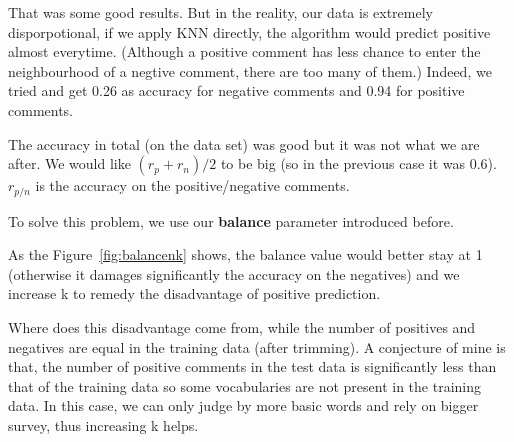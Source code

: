 \documentclass{article}
\begin{document}
That was some good results. But in the reality, our data is extremely disporpotional,
if we apply KNN directly, the algorithm would predict positive almost everytime. (Although
a positive comment has less chance to enter the neighbourhood of a negtive comment,
there are too many of them.) Indeed, we tried and get 0.26 as accuracy for negative comments and 0.94 for
positive comments.

The accuracy in total (on the data set) was good but it was not what we are after. We would like
$(r_p+r_n)/2$ to be big (so in the previous case it was 0.6). $r_{p/n}$ is the accuracy on the positive/negative comments.

To solve this problem, we use our \textbf{balance} parameter introduced before.

As the Figure~\ref{fig:balancenk} shows, the balance value would
better stay at 1 (otherwise it damages significantly
the accuracy on the negatives) and we increase k to
remedy the disadvantage of positive prediction.

Where does this disadvantage come from, while the number
of positives and negatives are equal in the training data (after trimming).
A conjecture of mine is that, the number of positive comments in the test data
is significantly less than that of the training data so
some vocabularies are not present in the training data. In this case,
we can only judge by more basic words and rely on bigger survey, thus increasing k helps.
\end{document}
